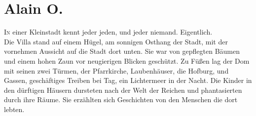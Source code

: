 \chapter{Alain O.}


\lettrine{I}{n} einer Kleinstadt kennt jeder jeden, und jeder niemand. Eigentlich.\\
Die Villa stand auf einem Hügel, am sonnigen Osthang der Stadt, mit der vornehmen Aussicht auf die Stadt dort unten. Sie war von gepflegten Bäumen und einem hohen Zaun vor neugierigen Blicken geschützt. Zu Füßen lag der Dom mit seinen zwei Türmen, der Pfarrkirche, Laubenhäuser, die Hofburg, und Gassen, geschäftiges Treiben bei Tag, ein Lichtermeer in der Nacht. Die Kinder in den dürftigen Häusern dursteten nach der Welt der Reichen und phantasierten durch ihre Räume. Sie erzählten sich Geschichten von den Menschen die dort lebten. \\\\
